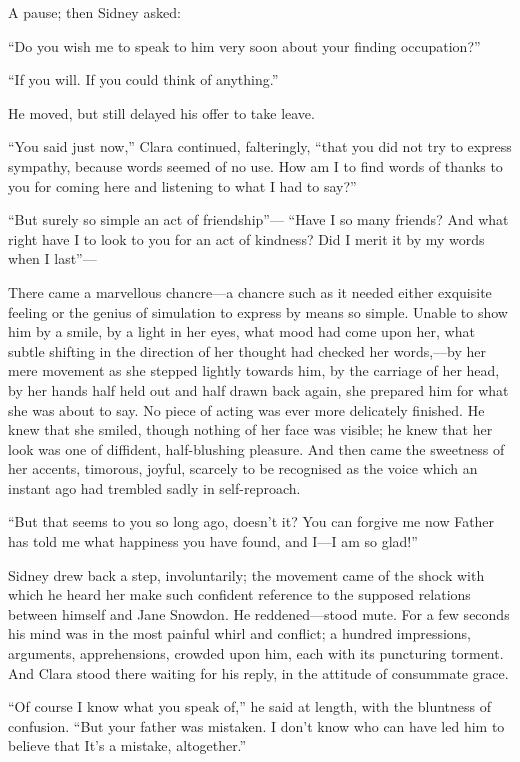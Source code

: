 A pause; then Sidney asked:

``Do you wish me to speak to him very soon about your finding
occupation?''

``If you will. If you could think of anything.''

He moved, but still delayed his offer to take leave.

``You said just now,'' Clara continued, falteringly, ``that you did not
try to express sympathy, because words seemed of no use. How am I to
find words of thanks to you for coming here and listening to what I had
to say?''

``But surely so simple an act of friendship''---
{\protect\hypertarget{88}{}{}} ``Have I so many friends? And what right
have I to look to you for an act of kindness? Did I merit it by my words
when I last''---

There came a marvellous chancre---a chancre such as it needed either
exquisite feeling or the genius of simulation to express by means so
simple. Unable to show him by a smile, by a light in her eyes, what mood
had come upon her, what subtle shifting in the direction of her thought
had checked her words,---by her mere movement as she stepped lightly
towards him, by the carriage of her head, by her hands half held out and
half drawn back again, she prepared him for what she was about to say.
No piece of acting was ever more delicately finished. He knew that she
smiled, though nothing of her face was visible; he knew that her look
was one of diffident, half-blushing pleasure. And then came the
sweetness of her accents, timorous, joyful, scarcely to be recognised as
the voice which an instant ago had trembled sadly in self-reproach.

``But that seems to you so long ago, doesn't it? You can forgive me now
Father has told me what happiness you have found, and I---I am so
glad!''

{\protect\hypertarget{89}{}{}} Sidney drew back a step, involuntarily;
the movement came of the shock with which he heard her make such
confident reference to the supposed relations between himself and Jane
Snowdon. He reddened---stood mute. For a few seconds his mind was in the
most painful whirl and conflict; a hundred impressions, arguments,
apprehensions, crowded upon him, each with its puncturing torment. And
Clara stood there waiting for his reply, in the attitude of consummate
grace.

``Of course I know what you speak of,'' he said at length, with the
bluntness of confusion. ``But your father was mistaken. I don't know who
can have led him to believe that It's a mistake, altogether.''

